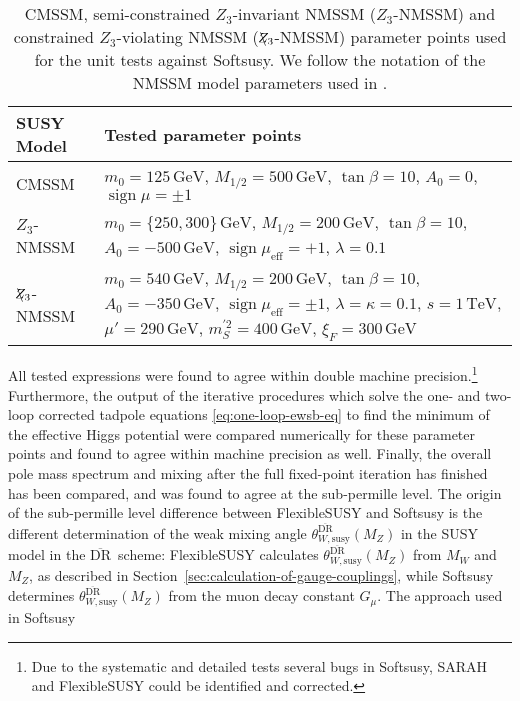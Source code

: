 \documentclass[final,3p,11pt,pdflatex]{elsarticle}
\makeatletter
\newcommand{\fs}{FlexibleSUSY\@\xspace}
\newcommand{\textoverline}[1]{$\overline{\mbox{#1}}$}
\newcommand{\DRbar}{\textoverline{DR}\xspace}
\newcommand{\unit}[1]{\,\text{#1}}      %
\newcommand{\secref}[1]{Section~\ref{#1}}
\newcommand{\Zv}{\mathbf{\backslash}\mkern-11.0mu{Z}}
\DeclareMathOperator{\sign}{sign}
\makeatother
\begin{document}
\begin{table}[tbh]
  \centering
  \begin{tabularx}{\textwidth}{lX}
    \toprule
    SUSY Model & Tested parameter points\\
    \midrule CMSSM & $m_0 = 125\unit{GeV}$, $M_{1/2} = 500\unit{GeV}$,
    $\tan\beta = 10$, $A_0 = 0$, $\sign\mu = \pm 1$
    \\
    $Z_3$-NMSSM & $m_0 = \{250,300\}\unit{GeV}$, $M_{1/2} =
    200\unit{GeV}$, $\tan\beta = 10$, $A_0 = -500\unit{GeV}$,
    $\sign\mu_\text{eff} = +1$, $\lambda = 0.1$
    \\
    $\Zv_3$-NMSSM & $m_0 = 540\unit{GeV}$, $M_{1/2} = 200\unit{GeV}$,
    $\tan\beta = 10$, $A_0 = -350\unit{GeV}$, $\sign\mu_\text{eff} =
    \pm 1$, $\lambda = \kappa = 0.1$, $s = 1\unit{TeV}$, $\mu' =
    290\unit{GeV}$, $m_S^{\prime 2} = 400\unit{GeV}$, $\xi_F =
    300\unit{GeV}$
    \\
    \bottomrule
  \end{tabularx}
  \caption{CMSSM, semi-constrained
    $Z_3$-invariant NMSSM ($Z_3$-NMSSM) and constrained
    $Z_3$-violating NMSSM ($\Zv_3$-NMSSM) parameter points
    used for the unit tests against Softsusy.
    We follow the notation of the NMSSM model parameters used in
    \cite{Allanach:2013kza,Ellwanger:2009dp}.}
  \label{tab:unit-test-parameter-points}
\end{table}
%
All tested expressions were found to agree within double machine
precision.\footnote{Due to the systematic and detailed tests several
  bugs in Softsusy, SARAH and \fs could be identified and corrected.}
Furthermore, the output of the iterative procedures which solve the
one- and two-loop corrected tadpole equations
\eqref{eq:one-loop-ewsb-eq} to find the minimum of the effective Higgs
potential were compared numerically for these parameter points and
found to agree within machine precision as well.  Finally, the overall
pole mass spectrum and mixing after the full fixed-point iteration has
finished has been compared, and was found to agree at the sub-permille
level.  The origin of the sub-permille level difference between \fs
and Softsusy is the different determination of the weak mixing angle
$\theta_{W,\text{susy}}^{\text{\DRbar}}(M_Z)$ in the SUSY model in the
\DRbar\ scheme: \fs calculates
$\theta_{W,\text{susy}}^{\text{\DRbar}}(M_Z)$ from $M_W$ and $M_Z$, as
described in \secref{sec:calculation-of-gauge-couplings}, while
Softsusy determines $\theta_{W,\text{susy}}^{\text{\DRbar}}(M_Z)$ from
the muon decay constant $G_\mu$.  The approach used in Softsusy
\end{document}

